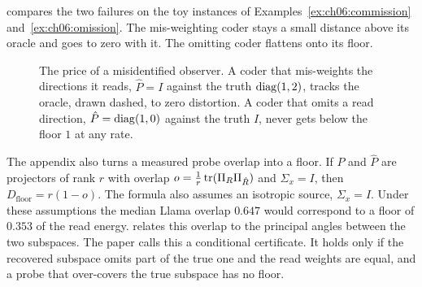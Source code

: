  compares the two failures on the toy instances of Examples~\ref{ex:ch06:commission} and~\ref{ex:ch06:omission}. The mis-weighting coder stays a small distance above its oracle and goes to zero with it. The omitting coder flattens onto its floor.

\begin{figure}[tbp]\centering
{}
\caption{The price of a misidentified observer. A coder that mis-weights the directions it reads, $\hat P=I$ against the truth $\operatorname{diag}(1,2)$, tracks the oracle, drawn dashed, to zero distortion. A coder that omits a read direction, $\hat P=\operatorname{diag}(1,0)$ against the truth $I$, never gets below the floor $1$ at any rate.}
\label{fig:ch06:mismatch}
\end{figure}

The appendix also turns a measured probe overlap into a floor. If $P$ and $\hat P$ are projectors of rank $r$ with overlap $o=\tfrac1r\operatorname{tr}(\Pi_R\Pi_{\hat R})$ and $\Sigma_x=I$, then $D_{\mathrm{floor}}=r(1-o)$. The formula also assumes an isotropic source, $\Sigma_x=I$. Under these assumptions the median Llama overlap $0.647$ would correspond to a floor of $0.353$ of the read energy.  relates this overlap to the principal angles between the two subspaces. The paper calls this a conditional certificate. It holds only if the recovered subspace omits part of the true one and the read weights are equal, and a probe that over-covers the true subspace has no floor.

